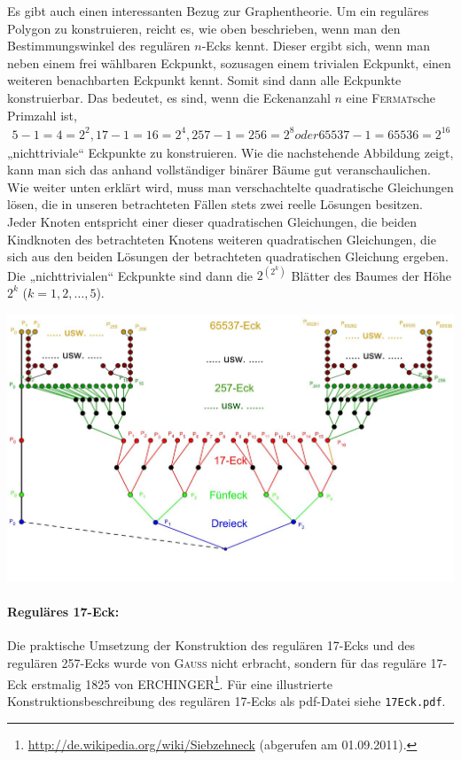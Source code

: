 \documentclass[11pt]{article}
\newcommand{\br}[1]{\ensuremath{\left(#1\right)}}
\begin{document}
Es gibt auch einen interessanten Bezug zur Graphentheorie. Um ein reguläres
Polygon zu konstruieren, reicht es, wie oben beschrieben, wenn man den
Bestimmungswinkel des regulären $n$-Ecks kennt. Dieser ergibt sich, wenn man
neben einem frei wählbaren Eckpunkt, sozusagen einem trivialen Eckpunkt, einen
weiteren benachbarten Eckpunkt kennt. Somit sind dann alle Eckpunkte
konstruierbar. Das bedeutet, es sind, wenn die Eckenanzahl $n$ eine
\textsc{Fermat}sche Primzahl ist,
\begin{gather*}
  5 - 1 = 4 = 2^2, 17 - 1 = 16 = 2^4, 257 - 1 = 256 = 2^8 oder 65537 - 1 =
  65536 = 2^{16}
\end{gather*}
„nichttriviale“ Eckpunkte zu konstruieren. Wie die nachstehende Abbildung
zeigt, kann man sich das anhand vollständiger binärer Bäume gut
veranschaulichen. Wie weiter unten erklärt wird, muss man verschachtelte
quadratische Gleichungen lösen, die in unseren betrachteten Fällen stets zwei
reelle Lösungen besitzen. Jeder Knoten entspricht einer dieser quadratischen
Gleichungen, die beiden Kindknoten des betrachteten Knotens weiteren
quadratischen Gleichungen, die sich aus den beiden Lösungen der betrachteten
quadratischen Gleichung ergeben. Die „nichttrivialen“ Eckpunkte sind dann die
$2^{\br{2^k}}$ Blätter des Baumes der Höhe $2^k$ ($k = 1,2,\ldots,5$).
\begin{center}
  \includegraphics[width=.7\textwidth]{Baum.jpg}
\end{center}

\paragraph{Reguläres 17-Eck:}
Die praktische Umsetzung der Konstruktion des regulären 17-Ecks und des
regulären 257-Ecks wurde von \textsc{Gauss} nicht erbracht, sondern für das
reguläre 17-Eck erstmalig 1825 von
ERCHINGER\footnote{\url{http://de.wikipedia.org/wiki/Siebzehneck} (abgerufen
  am 01.09.2011).}. Für eine illustrierte Konstruktionsbeschreibung des
regulären 17-Ecks als pdf-Datei siehe \texttt{17Eck.pdf}.
\end{document}
